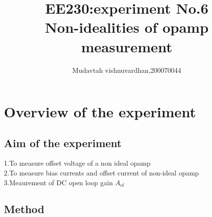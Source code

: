 \documentclass[12pt]{article}
\title{EE230:experiment No.6\\
Non-idealities of opamp measurement}
\author{Mudavtah vishnuvardhan,200070044}
\begin{document}
\maketitle


\section{Overview of the experiment} %

\subsection{Aim of the experiment}%
1.To measure offset voltage of a non ideal opamp\\
2.To measure bias currents and offset current of non-ideal opamp\\
3.Meaurement of DC open loop gain \(A_{ol}\)\\
\newpage
\subsection{Method}
\end{document}
